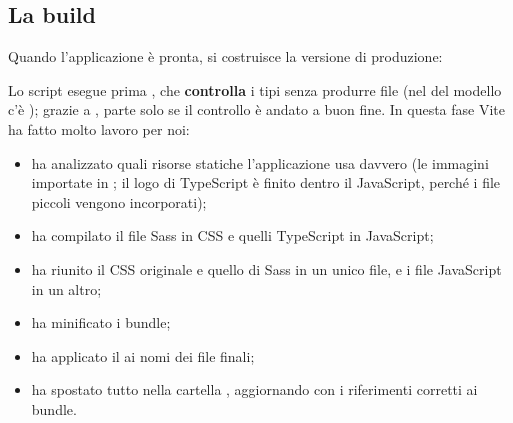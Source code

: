 \subsection{La build}

Quando l'applicazione è pronta, si costruisce la versione di produzione:

{\wtglifi
{}
}

Lo script esegue prima , che \textbf{controlla} i tipi senza produrre
file (nel  del modello c'è ); grazie a
\code{\&\&},  parte solo se il controllo è andato a buon fine.
In questa fase Vite ha fatto molto lavoro per noi:

\begin{itemize}
  \item ha analizzato quali risorse statiche l'applicazione usa davvero (le
        immagini importate in ; il logo di TypeScript è finito
        dentro il JavaScript, perché i file piccoli vengono incorporati);
  \item ha compilato il file Sass in CSS e quelli TypeScript in JavaScript;
  \item ha riunito il CSS originale e quello di Sass in un unico file, e i file
        JavaScript in un altro;
  \item ha minificato i bundle;
  \item ha applicato il  ai nomi dei file finali;
  \item ha spostato tutto nella cartella , aggiornando
         con i riferimenti corretti ai bundle.
\end{itemize}

